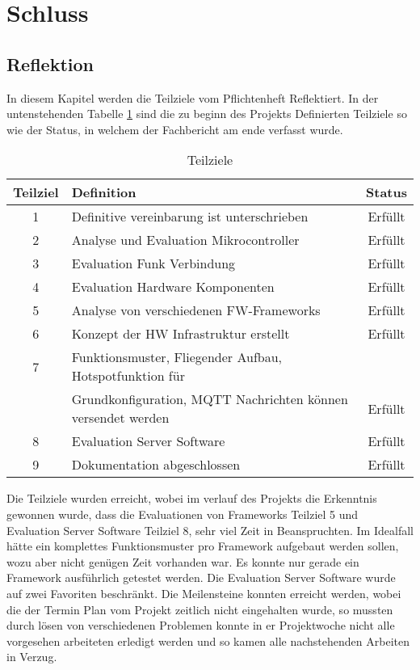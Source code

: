 \section{Schluss}

\subsection{Reflektion} 

In diesem Kapitel werden die Teilziele vom Pflichtenheft Reflektiert. In der untenstehenden Tabelle \ref{tab: Teilziele} sind die zu beginn des Projekts Definierten Teilziele so wie der Status, in welchem der Fachbericht am ende verfasst wurde.
\begin{table}[h!]
	\begin{tabular}{|c|l|c|}
		\hline 
		Teilziel & Definition & Status \\ 
		\hline 
		1 & Definitive vereinbarung ist unterschrieben & Erfüllt \\ 
		\hline 
		2 & Analyse und Evaluation Mikrocontroller & Erfüllt \\ 
		\hline 
		3 & Evaluation Funk Verbindung & Erfüllt \\ 
		\hline 
		4 & Evaluation Hardware Komponenten & Erfüllt \\ 
		\hline 
		5 & Analyse von verschiedenen FW-Frameworks & Erfüllt \\ 
		\hline 
		6 & Konzept der HW Infrastruktur erstellt & Erfüllt \\ 
		\hline 
		7 & Funktionsmuster, Fliegender Aufbau, Hotspotfunktion für& \\
		& Grundkonfiguration, MQTT Nachrichten können versendet werden & Erfüllt \\ 
		\hline 
		8 & Evaluation Server Software & Erfüllt \\ 
		\hline 
		9 & Dokumentation abgeschlossen & Erfüllt \\ 
		\hline 
		\end{tabular}
	\caption{Teilziele}
	\label{tab: Teilziele}	 
\end{table}



Die Teilziele wurden erreicht, wobei im verlauf des Projekts die Erkenntnis gewonnen wurde, dass die Evaluationen von Frameworks Teilziel 5 und Evaluation Server Software Teilziel 8, sehr viel Zeit in Beanspruchten. Im Idealfall hätte ein komplettes Funktionsmuster pro Framework aufgebaut werden sollen, wozu aber nicht genügen Zeit vorhanden war. Es konnte nur gerade ein Framework ausführlich getestet werden. Die Evaluation Server Software wurde auf zwei Favoriten beschränkt. Die Meilensteine konnten erreicht werden, wobei die der Termin Plan vom Projekt zeitlich nicht eingehalten wurde, so mussten durch lösen von verschiedenen Problemen konnte in er Projektwoche nicht alle vorgesehen arbeiteten erledigt werden und so kamen alle nachstehenden Arbeiten in Verzug.


